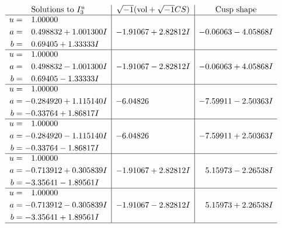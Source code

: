 \documentclass[1p]{elsarticle_modified}
\theoremstyle{definition}
\newcommand{\I}{\sqrt{-1}}
\begin{document}
$$\begin{array}{c|c|c}  
\text{Solutions to }I^u_{3}& \I (\text{vol} + \sqrt{-1}CS) & \text{Cusp shape}\\
 \hline 
\begin{aligned}
u &= \phantom{-}1.00000\phantom{ +0.000000I} \\
a &= \phantom{-}0.498832 + 1.001300 I \\
b &= \phantom{-}0.69405 + 1.33333 I\end{aligned}
 & -1.91067 + 2.82812 I & -0.06063 - 4.05868 I \\ \hline\begin{aligned}
u &= \phantom{-}1.00000\phantom{ +0.000000I} \\
a &= \phantom{-}0.498832 - 1.001300 I \\
b &= \phantom{-}0.69405 - 1.33333 I\end{aligned}
 & -1.91067 - 2.82812 I & -0.06063 + 4.05868 I \\ \hline\begin{aligned}
u &= \phantom{-}1.00000\phantom{ +0.000000I} \\
a &= -0.284920 + 1.115140 I \\
b &= -0.33764 + 1.86817 I\end{aligned}
 & -6.04826\phantom{ +0.000000I} & -7.59911 - 2.50363 I \\ \hline\begin{aligned}
u &= \phantom{-}1.00000\phantom{ +0.000000I} \\
a &= -0.284920 - 1.115140 I \\
b &= -0.33764 - 1.86817 I\end{aligned}
 & -6.04826\phantom{ +0.000000I} & -7.59911 + 2.50363 I \\ \hline\begin{aligned}
u &= \phantom{-}1.00000\phantom{ +0.000000I} \\
a &= -0.713912 + 0.305839 I \\
b &= -3.35641 - 1.89561 I\end{aligned}
 & -1.91067 + 2.82812 I & \phantom{-}5.15973 - 2.26538 I \\ \hline\begin{aligned}
u &= \phantom{-}1.00000\phantom{ +0.000000I} \\
a &= -0.713912 - 0.305839 I \\
b &= -3.35641 + 1.89561 I\end{aligned}
 & -1.91067 - 2.82812 I & \phantom{-}5.15973 + 2.26538 I\\
 \hline 
 \end{array}$$\newpage
\end{document}

